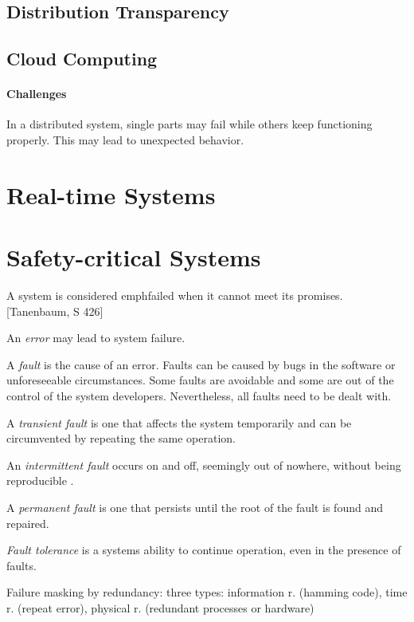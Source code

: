 \subsection{Distribution Transparency}



\subsection{Cloud Computing}

\paragraph{Challenges} In a distributed system, single parts may fail while others keep functioning properly.  This may lead to unexpected behavior.


\section{Real-time Systems}

\section{Safety-critical Systems}
A system is considered emph{failed} when it cannot meet its promises. [Tanenbaum, S 426]

An \emph{error} may lead to system failure.

A \emph{fault} is the cause of an error. Faults can be caused by bugs in the software or unforeseeable circumstances. Some faults are avoidable and some are out of the control of the system developers. Nevertheless, all faults need to be dealt with.

A \emph{transient fault} is one that affects the system temporarily and can be circumvented by repeating the same operation.

An \emph{intermittent fault} occurs on and off, seemingly out of nowhere, without being reproducible .

A \emph{permanent fault} is one that persists until the root of the fault is found and repaired.

\emph{Fault tolerance} is a systems ability to continue operation, even in the presence of faults.

Failure masking by redundancy: three types: information r. (hamming code), time r. (repeat error), physical r. (redundant processes or hardware)




